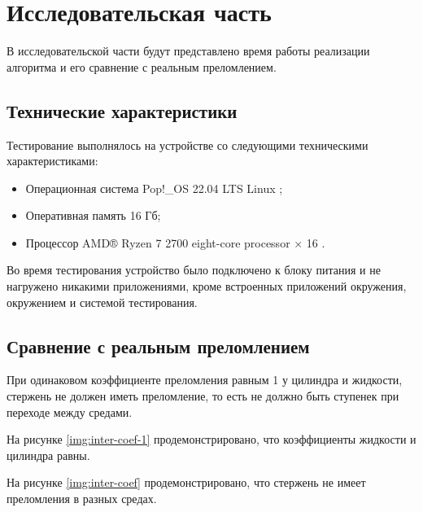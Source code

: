 \chapter{Исследовательская часть}
В исследовательской части будут представлено время работы реализации алгоритма и его сравнение с реальным преломлением.
\section{Технические характеристики}
Тестирование выполнялось на устройстве со следующими техническими характеристиками:
\begin{itemize}
	\item Операционная система Pop!\_OS 22.04 LTS \cite{ubuntu} Linux \cite{linux};
	\item Оперативная память 16 Гб;
	\item Процессор AMD® Ryzen 7 2700 eight-core processor × 16 \cite{amd}.
\end{itemize}
Во время тестирования устройство было подключено к блоку питания и не нагружено никакими приложениями, кроме встроенных приложений окружения, окружением и системой тестирования.

\section{Сравнение с реальным преломлением}

При одинаковом коэффициенте преломления равным 1 у цилиндра и жидкости, стержень не должен иметь преломление, то есть не должно быть ступенек при переходе между средами.

На рисунке \ref{img:inter-coef-1} продемонстрировано, что коэффициенты жидкости и цилиндра равны. 



\begin{figure}[ht!]
\end{figure}

На рисунке \ref{img:inter-coef} продемонстрировано, что стержень не имеет преломления в разных средах. 

